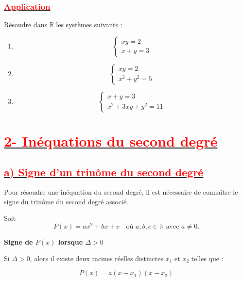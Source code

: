 \documentclass[12pt,a4paper]{article}
\begin{document}
\bigskip

\subsubsection*{\underline{\textcolor{red}{Application}}}

Résoudre dans $\mathbb{R}$ les systèmes suivants :

\begin{enumerate}
    \item 
    \[
    \begin{cases}
    xy = 2 \\
    x + y = 3
    \end{cases}
    \]

    \item 
    \[
    \begin{cases}
    xy = 2 \\
    x^2 + y^2 = 5
    \end{cases}
    \]

    \item 
    \[
    \begin{cases}
    x + y = 3 \\
    x^2 + 3xy + y^2 = 11
    \end{cases}
    \]
\end{enumerate}
\section*{\underline{\textcolor{red}{2- Inéquations du second degré}}}

\subsection*{\underline{\textcolor{red}{a) Signe d’un trinôme du second degré}}}

Pour résoudre une inéquation du second degré, il est nécessaire 
de connaître le signe du trinôme du second degré associé.

\medskip

Soit 
\[
P(x) = ax^2 + bx + c
\quad \text{où } a,b,c \in \mathbb{R} \text{ avec } a \neq 0.
\]

\bigskip

\textbf{Signe de $P(x)$ lorsque $\Delta > 0$}

\medskip

Si $\Delta > 0$, alors il existe deux racines réelles distinctes 
$x_1$ et $x_2$ telles que :

\[
P(x) = a(x - x_1)(x - x_2)
\]
\end{document}
